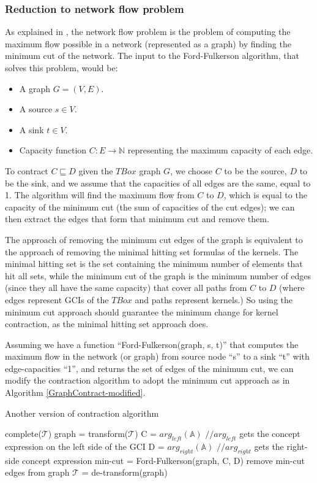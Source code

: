 \subsubsection{Reduction to network flow problem}
As explained in \cite{alg}, the network flow problem is the problem of computing the maximum flow possible in a network (represented as a graph) by finding the minimum cut of the network. The input to the Ford-Fulkerson algorithm, that solves this problem, would be:
\begin{itemize}
\item A graph $G = (V, E)$.
\item A source $s \in V$.
\item A sink $t \in V$.
\item Capacity function $C:E \rightarrow \mathbb{N}$ representing the maximum capacity of each edge.
\end{itemize}

To contract $C \sqsubseteq D$ given the $TBox$ graph $G$, we choose $C$ to be the source, $D$ to be the sink, and we assume that the capacities of all edges are the same, equal to 1. The algorithm will find the maximum flow from $C$ to $D$, which is equal to the capacity of the minimum cut (the sum of capacities of the cut edges); we can then extract the edges that form that minimum cut and remove them.

The approach of removing the minimum cut edges of the graph is equivalent to the approach of removing the minimal hitting set formulas of the kernels. The minimal hitting set is the set containing the minimum number of elements that hit all sets, while the minimum cut of the graph is the minimum number of edges (since they all have the same capacity) that cover all paths from $C$ to $D$ (where edges represent GCIs of the $TBox$ and paths represent kernels.) So using the minimum cut approach should guarantee the minimum change for kernel contraction, as the minimal hitting set approach does.

Assuming we have a function ``Ford-Fulkerson(graph, s, t)'' that computes the maximum flow in the network (or graph) from source node ``s'' to a sink  ``t'' with edge-capacities ``1'', and returns the set of edges of the minimum cut, we can modify the contraction algorithm to adopt the minimum cut approach as in Algorithm \ref{GraphContract-modified}.

\begin{algorithm}
\caption{Another version of contraction algorithm}
\label{GraphContract-modified}
\begin{algorithmic}[1]
\State complete($ \mathcal{T} $)
\State graph = transform($ \mathcal{T} $)
\State C = $arg_{left}(\mathbb{A})$ $//arg_{left}$ gets the concept expression on the left side of the GCI
\State D = $arg_{right}(\mathbb{A})$ $//arg_{right}$ gets the right-side concept expression
\State min-cut = Ford-Fulkerson(graph, C, D)
\State remove min-cut edges from graph
\State $ \mathcal{T} $ = de-transform(graph)
\EndFunction
\end{algorithmic}
\end{algorithm}

